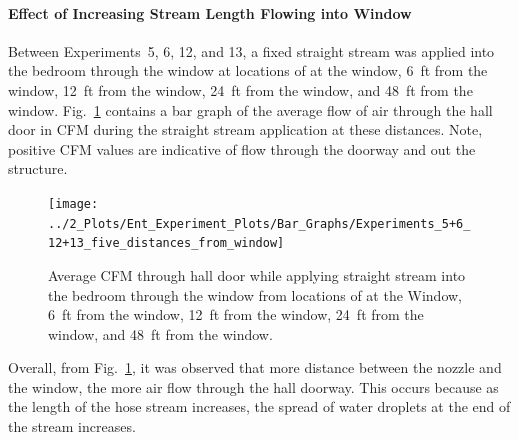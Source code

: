 \documentclass[12pt,oneside]{book}
\begin{document}
\clearpage

\paragraph{Effect of Increasing Stream Length Flowing into Window} \mbox{}

Between Experiments~5, 6, 12, and 13, a fixed straight stream was applied into the bedroom through the window at locations of at the window, 6~ft from the window, 12~ft from the window, 24~ft from the window, and 48~ft from the window. Fig.~\ref{fig:Exp5+6_12+13_bar_graph} contains a bar graph of the average flow of air through the hall door in CFM during the straight stream application at these distances. Note, positive CFM values are indicative of flow through the doorway and out the structure.
\\
\begin{figure}[H]
	\centering
	\texttt{[image: ../2\_Plots/Ent\_Experiment\_Plots/Bar\_Graphs/Experiments\_5+6\_12+13\_five\_distances\_from\_window]}
	\caption{Average CFM through hall door while applying straight stream into the bedroom through the window from locations of at the Window, 6~ft from the window, 12~ft from the window, 24~ft from the window, and 48~ft from the window.}
	\label{fig:Exp5+6_12+13_bar_graph}
\end{figure}

Overall, from Fig.~\ref{fig:Exp5+6_12+13_bar_graph}, it was observed that more distance between the nozzle and the window, the more air flow through the hall doorway. This occurs because as the length of the hose stream increases, the spread of water droplets at the end of the stream increases. 
\end{document}
